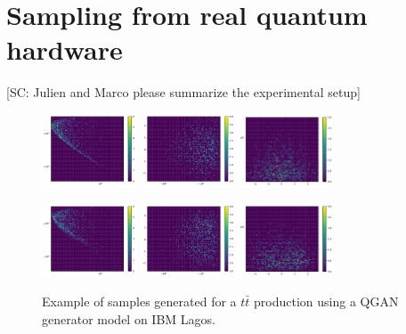 \documentclass[twocolumn,preprintnumbers,superscriptaddress]{revtex4-2}
\begin{document}
\section{Sampling from real quantum hardware}
\label{sec:deployment}

{\color{red}[SC: Julien and Marco please summarize the experimental setup]}

\begin{figure}
  \includegraphics[width=0.25\textwidth]{plots/hardware_1k/ibm_lagos/s-t_REAL_1000_100.pdf}%
  \includegraphics[width=0.25\textwidth]{plots/hardware_1k/ibm_lagos/t-y_REAL_1000_100.pdf}%
  \includegraphics[width=0.25\textwidth]{plots/hardware_1k/ibm_lagos/y-s_REAL_1000_100.pdf}

  \includegraphics[width=0.25\textwidth]{plots/hardware_1k/ibm_lagos/s-t_FAKE_1000_100_3_5_2_10000_128_0.5_1024.pdf}%
  \includegraphics[width=0.25\textwidth]{plots/hardware_1k/ibm_lagos/t-y_FAKE_1000_100_3_5_2_10000_128_0.5_1024.pdf}%
  \includegraphics[width=0.25\textwidth]{plots/hardware_1k/ibm_lagos/y-s_FAKE_1000_100_3_5_2_10000_128_0.5_1024.pdf}

  \caption{\label{fig:3dgauss}Example of samples generated for a $t\bar{t}$
    production using a QGAN generator model on IBM Lagos.}
\end{figure}
\end{document}

